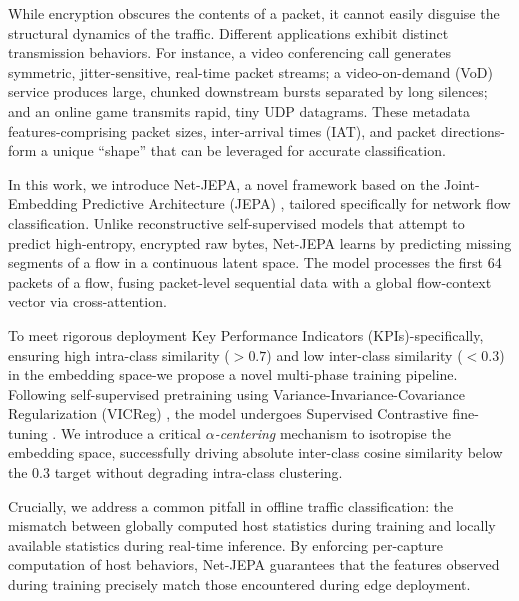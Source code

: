 \documentclass{article}
\begin{document}
While encryption obscures the contents of a packet, it cannot easily disguise the structural dynamics of the traffic. Different applications exhibit distinct transmission behaviors. For instance, a video conferencing call generates symmetric, jitter-sensitive, real-time packet streams; a video-on-demand (VoD) service produces large, chunked downstream bursts separated by long silences; and an online game transmits rapid, tiny UDP datagrams. These metadata features-comprising packet sizes, inter-arrival times (IAT), and packet directions-form a unique ``shape'' that can be leveraged for accurate classification.

In this work, we introduce Net-JEPA, a novel framework based on the Joint-Embedding Predictive Architecture (JEPA) \cite{assran2023ijepa, bardes2024vjepa}, tailored specifically for network flow classification. Unlike reconstructive self-supervised models that attempt to predict high-entropy, encrypted raw bytes, Net-JEPA learns by predicting missing segments of a flow in a continuous latent space. The model processes the first 64 packets of a flow, fusing packet-level sequential data with a global flow-context vector via cross-attention.

To meet rigorous deployment Key Performance Indicators (KPIs)-specifically, ensuring high intra-class similarity ($> 0.7$) and low inter-class similarity ($< 0.3$) in the embedding space-we propose a novel multi-phase training pipeline. Following self-supervised pretraining using Variance-Invariance-Covariance Regularization (VICReg) \cite{bardes2021vicreg}, the model undergoes Supervised Contrastive fine-tuning \cite{khosla2020supcon}. We introduce a critical \textit{$\alpha$-centering} mechanism to isotropise the embedding space, successfully driving absolute inter-class cosine similarity below the $0.3$ target without degrading intra-class clustering.

Crucially, we address a common pitfall in offline traffic classification: the mismatch between globally computed host statistics during training and locally available statistics during real-time inference. By enforcing per-capture computation of host behaviors, Net-JEPA guarantees that the features observed during training precisely match those encountered during edge deployment.
\end{document}
